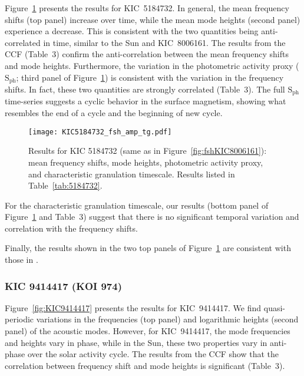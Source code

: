 \documentclass[twocolumn]{aastex61}%
\begin{document}
Figure~\ref{fig:KIC5184732} presents the results for KIC~5184732. In general, the mean frequency shifts (top panel) increase over time, while the mean mode heights (second panel) experience a decrease. This is consistent with the two quantities being anti-correlated in time, similar to the Sun and KIC~8006161. The results from the CCF (Table~3) confirm the anti-correlation between the mean frequency shifts and mode heights. Furthermore, the variation in the photometric activity proxy ($\text{S}_\text{ph}$; third panel of Figure~\ref{fig:KIC5184732}) is consistent with the variation in  the frequency shifts. In fact, these two quantities are strongly correlated (Table~3). The full $\text{S}_\text{ph}$ time-series suggests a cyclic behavior in the surface magnetism, showing what resembles the end of a cycle and the beginning of new cycle. %

\begin{figure}[h]
\texttt{[image: KIC5184732\_fsh\_amp\_tg.pdf]}\vspace{-0.2cm}
\caption{Results for KIC 5184732 (same as in Figure~\ref{fig:fshKIC8006161}): mean frequency shifts, mode heights, photometric activity proxy, and characteristic granulation timescale. Results listed in Table~\ref{tab:5184732}.}\label{fig:KIC5184732}
\end{figure}

For the characteristic granulation timescale, our results (bottom panel of Figure~\ref{fig:KIC5184732} and Table~3) suggest that there is no significant temporal variation and correlation with the frequency shifts.%

Finally, the results shown in the two top panels of Figure~\ref{fig:KIC5184732} are consistent with those in \citet{Kiefer2017}.

\subsubsection{KIC 9414417 (KOI 974)}

Figure~\ref{fig:KIC9414417} presents the results for KIC~9414417. We find quasi-periodic variations in the frequencies (top panel) and logarithmic heights (second panel) of the acoustic modes. However, for KIC~9414417, the mode frequencies and heights vary in phase, while in the Sun, these two properties vary in anti-phase over the solar activity cycle. The results from the CCF show that the correlation between frequency shift and mode heights is significant (Table~3).%
\end{document}
